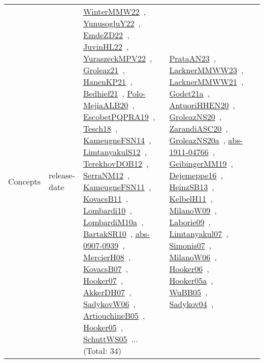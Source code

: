{\begin{longtable}{lp{3cm}>{\raggedright\arraybackslash}p{6cm}>{\raggedright\arraybackslash}p{6cm}>{\raggedright\arraybackslash}p{8cm}}
Concepts & release-date & \href{works/WinterMMW22.pdf}{WinterMMW22}~\cite{WinterMMW22}, \href{works/YunusogluY22.pdf}{YunusogluY22}~\cite{YunusogluY22}, \href{works/EmdeZD22.pdf}{EmdeZD22}~\cite{EmdeZD22}, \href{works/JuvinHL22.pdf}{JuvinHL22}~\cite{JuvinHL22}, \href{works/YuraszeckMPV22.pdf}{YuraszeckMPV22}~\cite{YuraszeckMPV22}, \href{works/Groleaz21.pdf}{Groleaz21}~\cite{Groleaz21}, \href{works/HanenKP21.pdf}{HanenKP21}~\cite{HanenKP21}, \href{works/Bedhief21.pdf}{Bedhief21}~\cite{Bedhief21}, \href{works/Polo-MejiaALB20.pdf}{Polo-MejiaALB20}~\cite{Polo-MejiaALB20}, \href{works/EscobetPQPRA19.pdf}{EscobetPQPRA19}~\cite{EscobetPQPRA19}, \href{works/Tesch18.pdf}{Tesch18}~\cite{Tesch18}, \href{works/KameugneFSN14.pdf}{KameugneFSN14}~\cite{KameugneFSN14}, \href{works/LimtanyakulS12.pdf}{LimtanyakulS12}~\cite{LimtanyakulS12}, \href{works/TerekhovDOB12.pdf}{TerekhovDOB12}~\cite{TerekhovDOB12}, \href{works/SerraNM12.pdf}{SerraNM12}~\cite{SerraNM12}, \href{works/KameugneFSN11.pdf}{KameugneFSN11}~\cite{KameugneFSN11}, \href{works/KovacsB11.pdf}{KovacsB11}~\cite{KovacsB11}, \href{works/Lombardi10.pdf}{Lombardi10}~\cite{Lombardi10}, \href{works/LombardiM10a.pdf}{LombardiM10a}~\cite{LombardiM10a}, \href{works/BartakSR10.pdf}{BartakSR10}~\cite{BartakSR10}, \href{works/abs-0907-0939.pdf}{abs-0907-0939}~\cite{abs-0907-0939}, \href{works/MercierH08.pdf}{MercierH08}~\cite{MercierH08}, \href{works/KovacsB07.pdf}{KovacsB07}~\cite{KovacsB07}, \href{works/Hooker07.pdf}{Hooker07}~\cite{Hooker07}, \href{works/AkkerDH07.pdf}{AkkerDH07}~\cite{AkkerDH07}, \href{works/SadykovW06.pdf}{SadykovW06}~\cite{SadykovW06}, \href{works/ArtiouchineB05.pdf}{ArtiouchineB05}~\cite{ArtiouchineB05}, \href{works/Hooker05.pdf}{Hooker05}~\cite{Hooker05}, \href{works/SchuttWS05.pdf}{SchuttWS05}~\cite{SchuttWS05}... (Total: 34) & \href{works/PrataAN23.pdf}{PrataAN23}~\cite{PrataAN23}, \href{works/LacknerMMWW23.pdf}{LacknerMMWW23}~\cite{LacknerMMWW23}, \href{works/LacknerMMWW21.pdf}{LacknerMMWW21}~\cite{LacknerMMWW21}, \href{works/Godet21a.pdf}{Godet21a}~\cite{Godet21a}, \href{works/AntuoriHHEN20.pdf}{AntuoriHHEN20}~\cite{AntuoriHHEN20}, \href{works/GroleazNS20.pdf}{GroleazNS20}~\cite{GroleazNS20}, \href{works/ZarandiASC20.pdf}{ZarandiASC20}~\cite{ZarandiASC20}, \href{works/GroleazNS20a.pdf}{GroleazNS20a}~\cite{GroleazNS20a}, \href{works/abs-1911-04766.pdf}{abs-1911-04766}~\cite{abs-1911-04766}, \href{works/GeibingerMM19.pdf}{GeibingerMM19}~\cite{GeibingerMM19}, \href{works/Dejemeppe16.pdf}{Dejemeppe16}~\cite{Dejemeppe16}, \href{works/HeinzSB13.pdf}{HeinzSB13}~\cite{HeinzSB13}, \href{works/KelbelH11.pdf}{KelbelH11}~\cite{KelbelH11}, \href{works/MilanoW09.pdf}{MilanoW09}~\cite{MilanoW09}, \href{works/Laborie09.pdf}{Laborie09}~\cite{Laborie09}, \href{works/Limtanyakul07.pdf}{Limtanyakul07}~\cite{Limtanyakul07}, \href{works/Simonis07.pdf}{Simonis07}~\cite{Simonis07}, \href{works/MilanoW06.pdf}{MilanoW06}~\cite{MilanoW06}, \href{works/Hooker06.pdf}{Hooker06}~\cite{Hooker06}, \href{works/Hooker05a.pdf}{Hooker05a}~\cite{Hooker05a}, \href{works/WuBB05.pdf}{WuBB05}~\cite{WuBB05}, \href{works/Sadykov04.pdf}{Sadykov04}~\cite{Sadykov04}, 
\end{longtable}}
